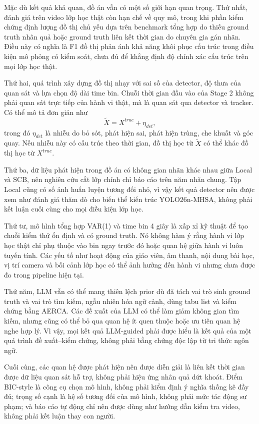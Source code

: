 Mặc dù kết quả khả quan, đồ án vẫn có một số giới hạn quan trọng. Thứ nhất, đánh giá trên video lớp học thật còn hạn chế về quy mô, trong khi phần kiểm chứng định lượng đồ thị chủ yếu dựa trên benchmark tổng hợp do thiếu ground truth nhân quả hoặc ground truth liên kết thời gian do chuyên gia gán nhãn. Điều này có nghĩa là F1 đồ thị phản ánh khả năng khôi phục cấu trúc trong điều kiện mô phỏng có kiểm soát, chưa đủ để khẳng định độ chính xác cấu trúc trên mọi lớp học thật.

Thứ hai, quá trình xây dựng đồ thị nhạy với sai số của detector, độ thưa của quan sát và lựa chọn độ dài time bin. Chuỗi thời gian đầu vào của Stage 2 không phải quan sát trực tiếp của hành vi thật, mà là quan sát qua detector và tracker. Có thể mô tả đơn giản như
\begin{equation}
\label{eq:detector-noise-model}
    \widetilde{X}=X^{true}+\eta_{det},
\end{equation}
trong đó \(\eta_{det}\) là nhiễu do bỏ sót, phát hiện sai, phát hiện trùng, che khuất và góc quay. Nếu nhiễu này có cấu trúc theo thời gian, đồ thị học từ \(\widetilde{X}\) có thể khác đồ thị học từ \(X^{true}\).

Thứ ba, dữ liệu phát hiện trong đồ án có không gian nhãn khác nhau giữa Local và SCB, nên nghiên cứu cắt lớp chính chỉ báo cáo trên năm nhãn chung. Tập Local cũng có số ảnh huấn luyện tương đối nhỏ, vì vậy kết quả detector nên được xem như đánh giá thăm dò cho biến thể kiến trúc YOLO26n-MHSA, không phải kết luận cuối cùng cho mọi điều kiện lớp học.

Thứ tư, mô hình tổng hợp VAR(1) và time bin 4 giây là xấp xỉ kỹ thuật để tạo chuỗi kiểm thử ổn định và có ground truth. Nó không hàm ý rằng hành vi lớp học thật chỉ phụ thuộc vào bin ngay trước đó hoặc quan hệ giữa hành vi luôn tuyến tính. Các yếu tố như hoạt động của giáo viên, âm thanh, nội dung bài học, vị trí camera và bối cảnh lớp học có thể ảnh hưởng đến hành vi nhưng chưa được đo trong pipeline hiện tại.

Thứ năm, LLM vẫn có thể mang thiên lệch prior dù đã tách vai trò sinh ground truth và vai trò tìm kiếm, ngẫu nhiên hóa ngữ cảnh, dùng tabu list và kiểm chứng bằng AERCA. Các đề xuất của LLM có thể làm giảm không gian tìm kiếm, nhưng cũng có thể bỏ qua quan hệ ít quen thuộc hoặc ưu tiên quan hệ nghe hợp lý. Vì vậy, mọi kết quả LLM-guided phải được hiểu là kết quả của một quá trình đề xuất--kiểm chứng, không phải bằng chứng độc lập từ tri thức ngôn ngữ.

Cuối cùng, các quan hệ được phát hiện nên được diễn giải là liên kết thời gian được dữ liệu quan sát hỗ trợ, không phải hiệu ứng nhân quả dứt khoát. Điểm BIC-style là công cụ chọn mô hình, không phải kiểm định ý nghĩa thống kê đầy đủ; trọng số cạnh là hệ số tương đối của mô hình, không phải mức tác động sư phạm; và báo cáo tự động chỉ nên được dùng như hướng dẫn kiểm tra video, không phải kết luận thay con người.